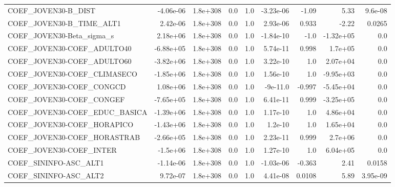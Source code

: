 \begin{tabular}{lrrrrrrrr}
COEF\_JOVEN30-B\_DIST               &   -4.06e-06 &     1.8e+308 &     0.0 &      1.0 &  -3.23e-06 &       -1.09 &         5.33 &       9.6e-08 \\
COEF\_JOVEN30-B\_TIME\_ALT1          &    2.42e-06 &     1.8e+308 &     0.0 &      1.0 &   2.93e-06 &       0.933 &        -2.22 &        0.0265 \\
COEF\_JOVEN30-Beta\_sigma\_s         &    2.18e+06 &     1.8e+308 &     0.0 &      1.0 &  -1.84e-10 &        -1.0 &    -1.32e+05 &           0.0 \\
COEF\_JOVEN30-COEF\_ADULTO40        &   -6.88e+05 &     1.8e+308 &     0.0 &      1.0 &   5.74e-11 &       0.998 &      1.7e+05 &           0.0 \\
COEF\_JOVEN30-COEF\_ADULTO60        &   -3.82e+06 &     1.8e+308 &     0.0 &      1.0 &   3.22e-10 &         1.0 &     2.07e+04 &           0.0 \\
COEF\_JOVEN30-COEF\_CLIMASECO       &   -1.85e+06 &     1.8e+308 &     0.0 &      1.0 &   1.56e-10 &         1.0 &    -9.95e+03 &           0.0 \\
COEF\_JOVEN30-COEF\_CONGCD          &    1.08e+06 &     1.8e+308 &     0.0 &      1.0 &   -9e-11.0 &      -0.997 &    -5.45e+04 &           0.0 \\
COEF\_JOVEN30-COEF\_CONGEF          &   -7.65e+05 &     1.8e+308 &     0.0 &      1.0 &   6.41e-11 &       0.999 &    -3.25e+05 &           0.0 \\
COEF\_JOVEN30-COEF\_EDUC\_BASICA     &   -1.39e+06 &     1.8e+308 &     0.0 &      1.0 &   1.17e-10 &         1.0 &     4.86e+04 &           0.0 \\
COEF\_JOVEN30-COEF\_HORAPICO        &   -1.43e+06 &     1.8e+308 &     0.0 &      1.0 &    1.2e-10 &         1.0 &     1.65e+04 &           0.0 \\
COEF\_JOVEN30-COEF\_HORASTRAB       &   -2.66e+05 &     1.8e+308 &     0.0 &      1.0 &   2.23e-11 &       0.999 &      2.7e+06 &           0.0 \\
COEF\_JOVEN30-COEF\_INTER           &    -1.5e+06 &     1.8e+308 &     0.0 &      1.0 &   1.27e-10 &         1.0 &     6.04e+05 &           0.0 \\
COEF\_SININFO-ASC\_ALT1             &   -1.14e-06 &     1.8e+308 &     0.0 &      1.0 &  -1.03e-06 &      -0.363 &         2.41 &        0.0158 \\
COEF\_SININFO-ASC\_ALT2             &    9.72e-07 &     1.8e+308 &     0.0 &      1.0 &   4.41e-08 &      0.0108 &         5.89 &      3.95e-09 \\

\end{tabular}
